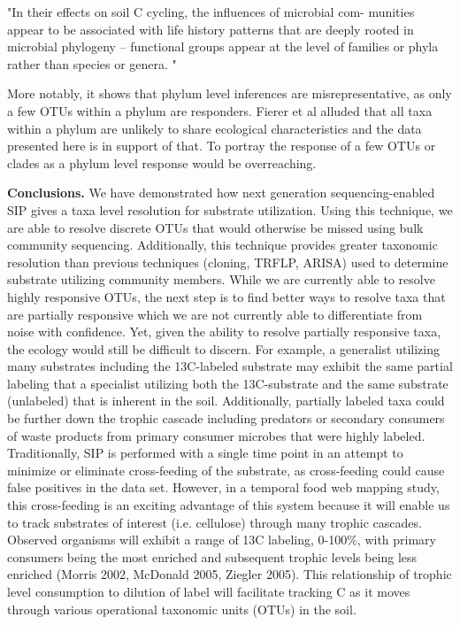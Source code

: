"In their effects on soil C cycling, the influences of microbial com- munities appear to be associated with life history patterns that are deeply rooted in microbial phylogeny – functional groups appear at the level of families or phyla rather than species or genera. "\cite{Schimel_2012}
 
More notably, it shows that phylum level inferences are misrepresentative, as only a few OTUs within a phylum are responders. Fierer et al \cite{Fierer_2007} alluded that all taxa within a phylum are unlikely to share ecological characteristics and the data presented here is in support of that. To portray the response of a few OTUs or clades as a phylum level response would be overreaching.
 
\textbf{Conclusions.} We have demonstrated how next generation sequencing-enabled SIP gives a taxa level resolution for substrate utilization. Using this technique, we are able to resolve discrete OTUs that would otherwise be missed using bulk community sequencing. Additionally, this technique provides greater taxonomic resolution than previous techniques (cloning, TRFLP, ARISA) used to determine substrate utilizing community members. While we are currently able to resolve highly responsive OTUs, the next step is to find better ways to resolve taxa that are partially responsive which we are not currently able to differentiate from noise with confidence.  Yet, given the ability to resolve partially responsive taxa, the ecology would still be difficult to discern.  For example, a generalist utilizing many substrates including the 13C-labeled substrate may exhibit the same partial labeling that a specialist utilizing both the 13C-substrate and the same substrate (unlabeled) that is inherent in the soil. Additionally, partially labeled taxa could be further down the trophic cascade including predators or secondary consumers of waste products from primary consumer microbes that were highly labeled.     
Traditionally, SIP is performed with a single time point in an attempt to minimize or eliminate cross-feeding of the substrate, as cross-feeding could cause false positives in the data set.  However, in a temporal food web mapping study, this cross-feeding is an exciting advantage of this system because it will enable us to track substrates of interest (i.e. cellulose) through many trophic cascades.  Observed organisms will exhibit a range of 13C labeling, 0-100\%, with primary consumers being the most enriched and subsequent trophic levels being less enriched (Morris 2002, McDonald 2005, Ziegler 2005).  This relationship of trophic level consumption to dilution of label will facilitate tracking C as it moves through various operational taxonomic units (OTUs) in the soil. 

